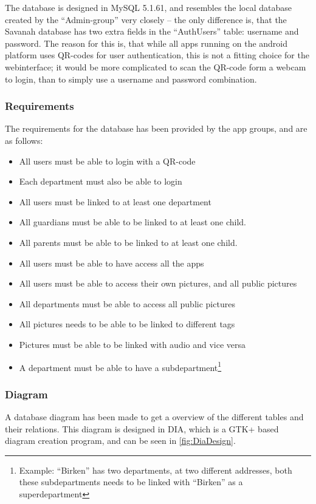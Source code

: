 The database is designed in MySQL 5.1.61, and resembles the local database created by the ``Admin-group'' very closely -- the only difference is, that the Savanah database has two extra fields in the ``AuthUsers'' table: username and password. The reason for this is, that while all apps running on the android platform uses QR-codes for user authentication, this is not a fitting choice for the webinterface; it would be more complicated to scan the QR-code form a webcam to login, than to simply use a username and password combination.

\subsubsection{Requirements}
The requirements for the database has been provided by the app groups, and are as follows:

\begin{itemize}
	\item All users must be able to login with a QR-code
	\item Each department must also be able to login
	\item All users must be linked to at least one department
	\item All guardians must be able to be linked to at least one child.
	\item All parents must be able to be linked to at least one child.
	\item All users must be able to have access all the apps
	\item All users must be able to access their own pictures, and all public pictures
	\item All departments must be able to access all public pictures
	\item All pictures needs to be able to be linked to different tags
	\item Pictures must be able to be linked with audio and vice versa
	\item A department must be able to have a subdepartment\footnote{Example: ``Birken'' has two departments, at two different addresses, both these subdepartments needs to be linked with ``Birken'' as a superdepartment}
\end{itemize}

\subsubsection*{Diagram}
A database diagram has been made to get a overview of the different tables and their relations. This diagram is designed in DIA, which is a GTK+ based diagram creation program\cite{Dia}, and can be seen in \autoref{fig:DiaDesign}.

